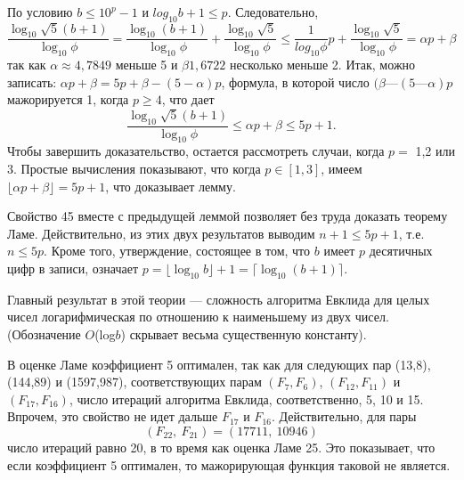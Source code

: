 \documentclass{mai_book}
\begin{document}
\begin{myproof}
По условию $b \leq 10^p - 1$ и $log_{10}{b+1} \leq p$. Следовательно,
\begin{equation*}
\frac{\log_{10}{\sqrt{5}(b+1)}}{\log_{10}{\phi}} = \frac{\log_{10}{(b+1)}}{\log_{10}{\phi}} + \frac{\log_{10}{\sqrt{5}}}{\log_{10}{\phi}} \leq \frac{1}{log_{10}{\phi}}p + \frac{\log_{10}{\sqrt{5}}}{\log_{10}{\phi}} = \alpha p + \beta
\end{equation*}
так как $\alpha \approx 4,7849$ меньше 5 и $\beta 1,6722$ несколько меньше 2. 
Итак, можно записать: $\alpha p + \beta = 5p + \beta - (5 - \alpha)p$, формула, в которой 
число $(\beta — (5 — \alpha)p$ мажорируется 1, когда $p \geq 4$, что дает
\begin{equation*}
\frac{\log_{10}{\sqrt{5}(b+1)}}{\log_{10}{\phi}} \leq \alpha p + \beta \leq 5p + 1.
\end{equation*}
Чтобы завершить доказательство, остается рассмотреть случаи, 
когда $p =$ 1,2 или 3. Простые вычисления показывают, что когда 
$p \in [1,3]$, имеем $\lfloor \alpha p + \beta \rfloor = 5p + 1$, что доказывает лемму.
\end{myproof} 

\begin{myproof}
Свойство 45 вместе с предыдущей леммой позволяет без труда  
доказать теорему Ламе. Действительно, из этих двух результатов  
выводим $n + 1 \leq 5p + 1$, т.е. $n \leq 5p$. Кроме того, утверждение,  
состоящее в том, что $b$ имеет $p$ десятичных цифр в записи, означает 
$p = \lfloor \log_{10}{b} \rfloor + 1 = \lceil \log_{10}{(b+1)} \rceil$.
\end{myproof}

Главный результат в этой теории — сложность алгоритма  
Евклида для целых чисел логарифмическая по отношению к наименьшему из 
двух чисел. (Обозначение $O$(log$b$) скрывает весьма существенную  
константу).

\begin{mynotice}
В оценке Ламе коэффициент 5 оптимален, так как 
для следующих пар (13,8), (144,89) и (1597,987),  
соответствующих парам $(F_7,F_6)$, $(F_{12},F_{11})$ и $(F_{17},F_{16})$, число итераций  
алгоритма Евклида, соответственно, 5, 10 и 15. Впрочем, это свойство 
не идет дальше $F_{17}$ и $F_{16}$. Действительно, для пары
\begin{equation*}
(F_{22},\: F_{21}) = (17711,\: 10946)
\end{equation*} 
число итераций равно 20, в то время как оценка Ламе 25. Это  
показывает, что если коэффициент 5 оптимален, то мажорирующая 
функция таковой не является. 
\end{mynotice} 
\end{document}
